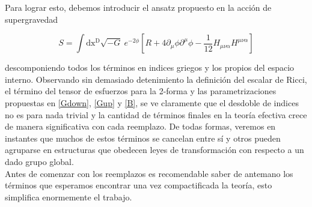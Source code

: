 \documentclass{article}
\numberwithin{equation}{section}
\begin{document}
Para lograr esto, debemos introducir el ansatz propuesto en la acción de supergravedad

\begin{equation}\label{S}
S=\int\mathrm{dx^D} \sqrt{-G} \ e^{-2\phi}\left[R + 4 \partial_{\mu}\phi\partial^{\mu} \phi - \frac{1}{12} H_{\mu \nu \alpha}H^{\mu \nu \alpha}\right]  
\end{equation}

descomponiendo todos los términos en indices griegos y los propios del espacio interno. Observando sin demasiado detenimiento la definición del escalar de Ricci, el término del tensor de esfuerzos para la 2-forma y las parametrizaciones propuestas en \ref{Gdown}, \ref{Gup} y \ref{B}, se ve claramente que el desdoble de indices no es para nada trivial y la cantidad de términos finales en la teoría efectiva crece de manera significativa con cada reemplazo. De todas formas, veremos en instantes que muchos de estos términos se cancelan entre sí y otros pueden agruparse en estructuras que obedecen leyes de transformación con respecto a un dado grupo global.\\ 
	
Antes de comenzar con los reemplazos es recomendable saber de antemano los términos que esperamos encontrar una vez compactificada la teoría, esto simplifica enormemente el trabajo.\\
\end{document}
